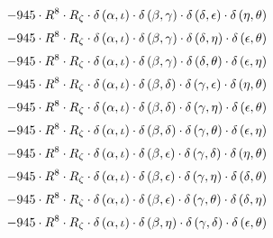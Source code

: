 \begin{subequations}
\begin{gather}
 \\[0.2em] \notag 		 - 945 \cdot R^{8} \cdot R_{\zeta{}} \cdot \delta{}\left(\alpha{}, \iota{}\right) \cdot \delta{}\left(\beta{}, \gamma{}\right) \cdot \delta{}\left(\delta{}, \epsilon{}\right) \cdot \delta{}\left(\eta{}, \theta{}\right) 
 \\[0.2em] \notag 		 - 945 \cdot R^{8} \cdot R_{\zeta{}} \cdot \delta{}\left(\alpha{}, \iota{}\right) \cdot \delta{}\left(\beta{}, \gamma{}\right) \cdot \delta{}\left(\delta{}, \eta{}\right) \cdot \delta{}\left(\epsilon{}, \theta{}\right) 
 \\[0.2em] \notag 		 - 945 \cdot R^{8} \cdot R_{\zeta{}} \cdot \delta{}\left(\alpha{}, \iota{}\right) \cdot \delta{}\left(\beta{}, \gamma{}\right) \cdot \delta{}\left(\delta{}, \theta{}\right) \cdot \delta{}\left(\epsilon{}, \eta{}\right) 
 \\[0.2em] \notag 		 - 945 \cdot R^{8} \cdot R_{\zeta{}} \cdot \delta{}\left(\alpha{}, \iota{}\right) \cdot \delta{}\left(\beta{}, \delta{}\right) \cdot \delta{}\left(\gamma{}, \epsilon{}\right) \cdot \delta{}\left(\eta{}, \theta{}\right) 
 \\[0.2em] \notag 		 - 945 \cdot R^{8} \cdot R_{\zeta{}} \cdot \delta{}\left(\alpha{}, \iota{}\right) \cdot \delta{}\left(\beta{}, \delta{}\right) \cdot \delta{}\left(\gamma{}, \eta{}\right) \cdot \delta{}\left(\epsilon{}, \theta{}\right) 
 \\[0.2em] \notag 		 - 945 \cdot R^{8} \cdot R_{\zeta{}} \cdot \delta{}\left(\alpha{}, \iota{}\right) \cdot \delta{}\left(\beta{}, \delta{}\right) \cdot \delta{}\left(\gamma{}, \theta{}\right) \cdot \delta{}\left(\epsilon{}, \eta{}\right) 
 \\[0.2em] \notag 		 - 945 \cdot R^{8} \cdot R_{\zeta{}} \cdot \delta{}\left(\alpha{}, \iota{}\right) \cdot \delta{}\left(\beta{}, \epsilon{}\right) \cdot \delta{}\left(\gamma{}, \delta{}\right) \cdot \delta{}\left(\eta{}, \theta{}\right) 
 \\[0.2em] \notag 		 - 945 \cdot R^{8} \cdot R_{\zeta{}} \cdot \delta{}\left(\alpha{}, \iota{}\right) \cdot \delta{}\left(\beta{}, \epsilon{}\right) \cdot \delta{}\left(\gamma{}, \eta{}\right) \cdot \delta{}\left(\delta{}, \theta{}\right) 
 \\[0.2em] \notag 		 - 945 \cdot R^{8} \cdot R_{\zeta{}} \cdot \delta{}\left(\alpha{}, \iota{}\right) \cdot \delta{}\left(\beta{}, \epsilon{}\right) \cdot \delta{}\left(\gamma{}, \theta{}\right) \cdot \delta{}\left(\delta{}, \eta{}\right) 
 \\[0.2em] \notag 		 - 945 \cdot R^{8} \cdot R_{\zeta{}} \cdot \delta{}\left(\alpha{}, \iota{}\right) \cdot \delta{}\left(\beta{}, \eta{}\right) \cdot \delta{}\left(\gamma{}, \delta{}\right) \cdot \delta{}\left(\epsilon{}, \theta{}\right) 

\end{gather}
\end{subequations}
